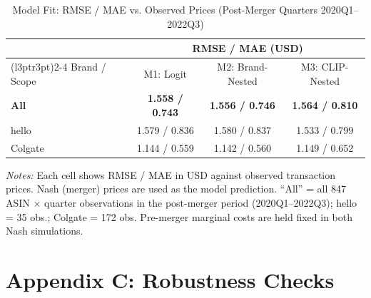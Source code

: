 \begin{table}[H]
\centering
\caption{\label{tab:appendix_rmse}Model Fit: RMSE / MAE vs. Observed Prices (Post-Merger Quarters 2020Q1--2022Q3)}
\centering
\fontsize{10}{12}\selectfont
\begin{tabular}[t]{lccc}
\toprule
\multicolumn{1}{c}{ } & \multicolumn{3}{c}{RMSE / MAE (USD)} \\
\cmidrule(l{3pt}r{3pt}){2-4}
Brand / Scope & M1: Logit & M2: Brand-Nested & M3: CLIP-Nested\\
\midrule
\textbf{All} & \textbf{1.558 / 0.743} & \textbf{1.556 / 0.746} & \textbf{1.564 / 0.810}\\
hello & 1.579 / 0.836 & 1.580 / 0.837 & 1.533 / 0.799\\
Colgate & 1.144 / 0.559 & 1.142 / 0.560 & 1.149 / 0.652\\
\bottomrule
\end{tabular}
\end{table}

\emph{Notes:} Each cell shows RMSE / MAE in USD against observed
transaction prices. Nash (merger) prices are used as the model
prediction. ``All'' = all 847 ASIN \(\times\) quarter observations in
the post-merger period (2020Q1--2022Q3); hello = 35 obs.; Colgate = 172
obs. Pre-merger marginal costs are held fixed in both Nash simulations.

\vspace{1em}

\section*{Appendix C: Robustness
Checks}\label{appendix-c-robustness-checks}

